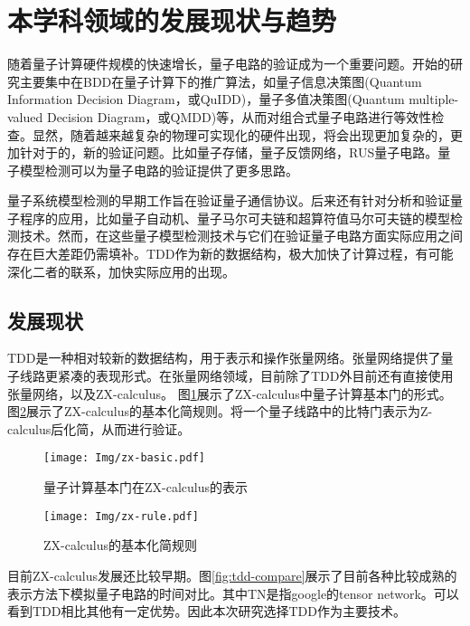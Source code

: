 \section{本学科领域的发展现状与趋势}
随着量子计算硬件规模的快速增长，量子电路的验证成为一个重要问题。开始的研究主要集中在BDD在量子计算下的推广算法，如量子信息决策图(Quantum Information Decision Diagram，或QuIDD)\citep{Viamontes_2003}，量子多值决策图(Quantum multiple-valued Decision Diagram，或QMDD)\citep{Seiter_2013}等，从而对组合式量子电路进行等效性检查。显然，随着越来越复杂的物理可实现化的硬件出现，将会出现更加复杂的，更加针对于的，新的验证问题。比如量子存储\citep{Kerckhoff_2010}，量子反馈网络\citep{Gough_2008}，RUS量子电路\citep{Bocharov_2015}。量子模型检测可以为量子电路的验证提供了更多思路。

量子系统模型检测的早期工作旨在验证量子通信协议\citep{Gay,BALTAZAR_2008,davidson2012model}。后来还有针对分析和验证量子程序的应用\citep{ying2016foundations}，比如量子自动机\citep{ying2014model}、量子马尔可夫链\citep{Ying_2013}和超算符值马尔可夫链\citep{feng2013model}的模型检测技术。然而，在这些量子模型检测技术与它们在验证量子电路方面实际应用之间存在巨大差距仍需填补。TDD作为新的数据结构，极大加快了计算过程，有可能深化二者的联系，加快实际应用的出现。
\subsection{发展现状}
TDD是一种相对较新的数据结构，用于表示和操作张量网络。张量网络提供了量子线路更紧凑的表现形式。在张量网络领域，目前除了TDD外目前还有直接使用张量网络，以及ZX-calculus\citep{van2020zx}。
图\ref{fig:zx-basic}展示了ZX-calculus中量子计算基本门的形式。图\ref{fig:zx-rule}展示了ZX-calculus的基本化简规则。将一个量子线路中的比特门表示为Z-calculus后化简，从而进行验证。

\begin{figure}[!htbp]
    \centering
    \texttt{[image: Img/zx-basic.pdf]}
    \caption{量子计算基本门在ZX-calculus的表示}
    \label{fig:zx-basic}
\end{figure}
\begin{figure}[!htbp]
    \centering
    \texttt{[image: Img/zx-rule.pdf]}
    \caption{ZX-calculus的基本化简规则}
    \label{fig:zx-rule}
\end{figure}
 
目前ZX-calculus发展还比较早期。图\ref{fig:tdd-compare}展示了目前各种比较成熟的表示方法下模拟量子电路的时间对比。其中TN是指google的tensor network。可以看到TDD相比其他有一定优势。因此本次研究选择TDD作为主要技术。

